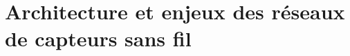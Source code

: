 \chapter[Architecture et enjeux des réseaux de capteurs]{Architecture et enjeux des réseaux de capteurs sans fil}\label{chap:st}

\renewcommand\chapterpath{Main/Structure}
\renewcommand\chapterfig{Main/Structure/Figures}



